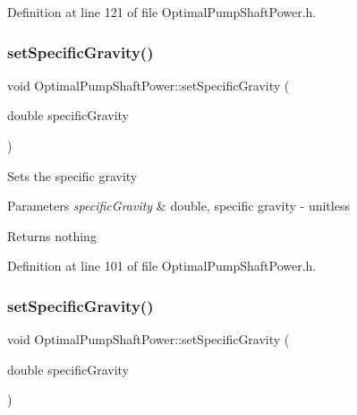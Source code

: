 Definition at line 121 of file Optimal\+Pump\+Shaft\+Power.\+h.

\mbox{\label{class_optimal_pump_shaft_power_aa565a332e4b144c8eb85fd06c541199e}} 
\subsubsection{\texorpdfstring{set\+Specific\+Gravity()}{setSpecificGravity()}\hspace{0.1cm}{\footnotesize\ttfamily [1/3]}}
{\footnotesize\ttfamily void Optimal\+Pump\+Shaft\+Power\+::set\+Specific\+Gravity (\begin{DoxyParamCaption}\item[{double}]{specific\+Gravity }\end{DoxyParamCaption})\hspace{0.3cm}{\ttfamily [inline]}}

Sets the specific gravity


\begin{DoxyParams}{Parameters}
{\em specific\+Gravity} & double, specific gravity -\/ unitless\\
\hline
\end{DoxyParams}
\begin{DoxyReturn}{Returns}
nothing 
\end{DoxyReturn}


Definition at line 101 of file Optimal\+Pump\+Shaft\+Power.\+h.

\mbox{\label{class_optimal_pump_shaft_power_aa565a332e4b144c8eb85fd06c541199e}} 
\subsubsection{\texorpdfstring{set\+Specific\+Gravity()}{setSpecificGravity()}\hspace{0.1cm}{\footnotesize\ttfamily [2/3]}}
{\footnotesize\ttfamily void Optimal\+Pump\+Shaft\+Power\+::set\+Specific\+Gravity (\begin{DoxyParamCaption}\item[{double}]{specific\+Gravity }\end{DoxyParamCaption})\hspace{0.3cm}{\ttfamily [inline]}}

